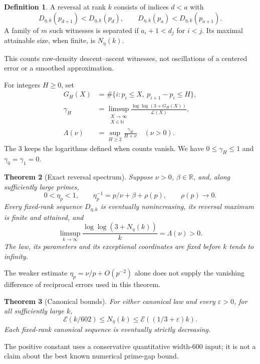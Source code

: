 \documentclass[11pt]{article}
\newtheorem{theorem}{Theorem}[section]
\theoremstyle{definition}
\newtheorem{definition}[theorem]{Definition}
\newcommand{\LL}{\mathcal L}
\newcommand{\EE}{\mathcal E}
\newcommand{\N}{\mathbb N}
\begin{document}
\begin{definition}\label{def:reversal}
A reversal at rank $k$ consists of indices $d<a$ with
\[
 D_{\eta,k}(p_{d+1})<D_{\eta,k}(p_d),\qquad
 D_{\eta,k}(p_a)<D_{\eta,k}(p_{a+1}).
\]
A family of $m$ such witnesses is separated if $a_i+1<d_j$ for
$i<j$. Its maximal attainable size, when finite, is $N_\eta(k)$.
\end{definition}
This counts raw-density descent--ascent witnesses, not oscillations
of a centered error or a smoothed approximation.

For integers $H\ge0$, set
\begin{equation}\label{eq:spectrum}
\begin{split}
 G_H(X)&=\#\{i:p_i\le X,\ p_{i+1}-p_i\le H\},\\
 \gamma_H&=\limsup_{\substack{X\to\infty\\X\in\N}}
       \frac{\log\log(3+G_H(X))}{\LL(X)},\\
 \Lambda(\nu)&=\sup_{H\ge2}\frac{\gamma_H}{H+\nu}\quad(\nu>0).
\end{split}
\end{equation}
The $3$ keeps the logarithms defined when counts vanish.
We have $0\le\gamma_H\le1$ and $\gamma_0=\gamma_1=0$.

\begin{theorem}[Exact reversal spectrum]\label{thm:spectrum}
Suppose $\nu>0$, $\beta\in\mathbb R$, and, along sufficiently large primes,
\begin{equation}\label{eq:smooth}
 0<\eta_p<1,\qquad
 \eta_p^{-1}=p/\nu+\beta+\rho(p),\qquad \rho(p)\longrightarrow0.
\end{equation}
Every fixed-rank sequence $D_{\eta,k}$ is eventually nonincreasing,
its reversal maximum is finite and attained, and
\begin{equation}\label{eq:rate}
 \limsup_{k\to\infty}\frac{\log\log(3+N_\eta(k))}{k}
       =\Lambda(\nu)>0.
\end{equation}
The law, its parameters and its exceptional coordinates are fixed
before $k$ tends to infinity.
\end{theorem}
The weaker estimate $\eta_p=\nu/p+O(p^{-2})$ alone does not supply
the vanishing difference of reciprocal errors used in this theorem.

\begin{theorem}[Canonical bounds]\label{thm:canonical}
For either canonical law and every $\varepsilon>0$, for all
sufficiently large $k$,
\[
 \EE(k/602)\le N_\eta(k)\le\EE((1/3+\varepsilon)k).
\]
Each fixed-rank canonical sequence is eventually strictly decreasing.
\end{theorem}
The positive constant uses a conservative quantitative width-$600$
input; it is not a claim about the best known numerical prime-gap bound.
\end{document}
